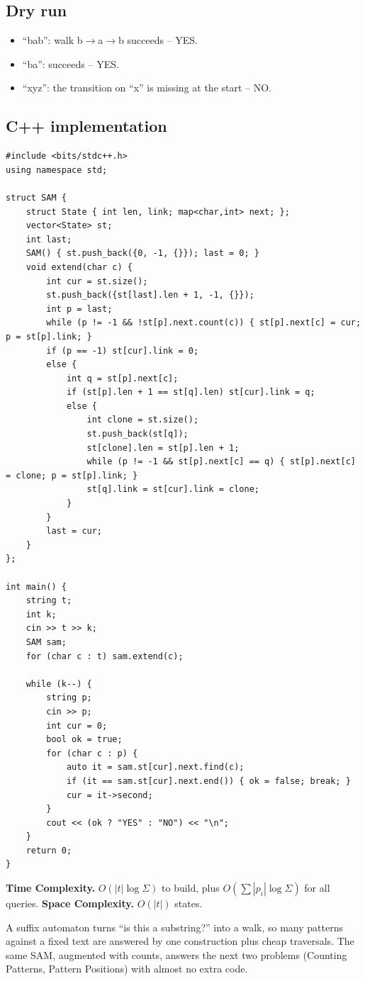 \subsection*{Dry run}


\begin{itemize}
  \item ``bab'': walk b$\to$a$\to$b succeeds -- YES.
  \item ``ba'': succeeds -- YES.
  \item ``xyz'': the transition on ``x'' is missing at the start -- NO.
\end{itemize}

\subsection*{C++ implementation}

\begin{lstlisting}
#include <bits/stdc++.h>
using namespace std;

struct SAM {
    struct State { int len, link; map<char,int> next; };
    vector<State> st;
    int last;
    SAM() { st.push_back({0, -1, {}}); last = 0; }
    void extend(char c) {
        int cur = st.size();
        st.push_back({st[last].len + 1, -1, {}});
        int p = last;
        while (p != -1 && !st[p].next.count(c)) { st[p].next[c] = cur; p = st[p].link; }
        if (p == -1) st[cur].link = 0;
        else {
            int q = st[p].next[c];
            if (st[p].len + 1 == st[q].len) st[cur].link = q;
            else {
                int clone = st.size();
                st.push_back(st[q]);
                st[clone].len = st[p].len + 1;
                while (p != -1 && st[p].next[c] == q) { st[p].next[c] = clone; p = st[p].link; }
                st[q].link = st[cur].link = clone;
            }
        }
        last = cur;
    }
};

int main() {
    string t;
    int k;
    cin >> t >> k;
    SAM sam;
    for (char c : t) sam.extend(c);

    while (k--) {
        string p;
        cin >> p;
        int cur = 0;
        bool ok = true;
        for (char c : p) {
            auto it = sam.st[cur].next.find(c);
            if (it == sam.st[cur].next.end()) { ok = false; break; }
            cur = it->second;
        }
        cout << (ok ? "YES" : "NO") << "\n";
    }
    return 0;
}
\end{lstlisting}

\begin{complexitybox}
\textbf{Time Complexity.} $O(|t|\log\Sigma)$ to build, plus
$O(\sum|p_i|\log\Sigma)$ for all queries. \textbf{Space Complexity.}
$O(|t|)$ states.
\end{complexitybox}

\begin{takeawaybox}
A suffix automaton turns ``is this a substring?'' into a walk, so many
patterns against a fixed text are answered by one construction plus cheap
traversals. The same SAM, augmented with counts, answers the next two
problems (Counting Patterns, Pattern Positions) with almost no extra code.
\end{takeawaybox}
